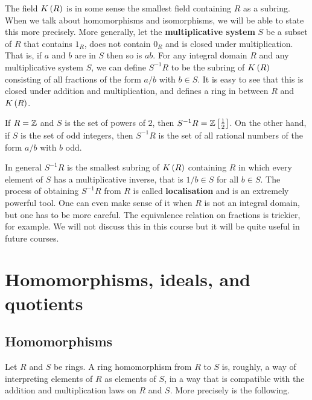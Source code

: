 The field $ K\br{R} $ is in some sense the smallest field containing $ R $ as a subring. When we talk about homomorphisms and isomorphisms, we will be able to state this more precisely. More generally, let the \textbf{multiplicative system} $ S $ be a subset of $ R $ that contains $ 1_R $, does not contain $ 0_R $ and is closed under multiplication. That is, if $ a $ and $ b $ are in $ S $ then so is $ ab $. For any integral domain $ R $ and any multiplicative system $ S $, we can define $ S^{-1}R $ to be the subring of $ K\br{R} $ consisting of all fractions of the form $ a / b $ with $ b \in S $. It is easy to see that this is closed under addition and multiplication, and defines a ring in between $ R $ and $ K\br{R} $.

\begin{example*}
If $ R = \mathbb{Z} $ and $ S $ is the set of powers of $ 2 $, then $ S^{-1}R = \ZZ\sbr{\tfrac{1}{2}} $. On the other hand, if $ S $ is the set of odd integers, then $ S^{-1}R $ is the set of all rational numbers of the form $ a / b $ with $ b $ odd.
\end{example*}

In general $ S^{-1}R $ is the smallest subring of $ K\br{R} $ containing $ R $ in which every element of $ S $ has a multiplicative inverse, that is $ 1 / b \in S $ for all $ b \in S $. The process of obtaining $ S^{-1}R $ from $ R $ is called \textbf{localisation} and is an extremely powerful tool. One can even make sense of it when $ R $ is not an integral domain, but one has to be more careful. The equivalence relation on fractions is trickier, for example. We will not discuss this in this course but it will be quite useful in future courses.

\pagebreak

\section{Homomorphisms, ideals, and quotients}

\subsection{Homomorphisms}

Let $ R $ and $ S $ be rings. A ring homomorphism from $ R $ to $ S $ is, roughly, a way of interpreting elements of $ R $ as elements of $ S $, in a way that is compatible with the addition and multiplication laws on $ R $ and $ S $. More precisely is the following.

